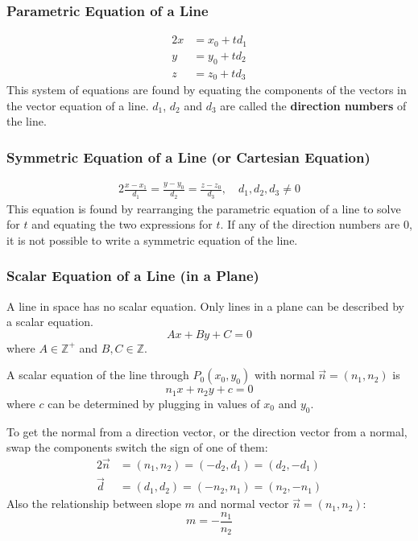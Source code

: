 \documentclass{report}
\newcommand\Z{\mathbb{Z}}
\theoremstyle{definition}
\numberwithin{equation}{section}
\begin{document}
\subsubsection{Parametric Equation of a Line}
\begin{alignat}{2}{}
	x &= x_0 + td_1 \\
	y &= y_0 + td_2 \\
	z &= z_0 + td_3
\end{alignat}
This system of equations are found by equating the components of the vectors in the vector equation of a line. $d_1$, $d_2$ and $d_3$ are called the \textbf{direction numbers} of the line.

\subsubsection{Symmetric Equation of a Line (or Cartesian Equation)}
\begin{alignat}{2}{}
	\frac{x-x_1}{d_1} = \frac{y-y_0}{d_2} = \frac{z-z_0}{d_3}, \quad d_1,d_2,d_3 \ne 0
\end{alignat}
This equation is found by rearranging the parametric equation of a line to solve for $t$ and equating the two expressions for $t$. If any of the direction numbers are $0$, it is not possible to write a symmetric equation of the line.

\subsubsection{Scalar Equation of a Line (in a Plane)}
A line in space has no scalar equation. Only lines in a plane can be described by a scalar equation.
\begin{equation}
	Ax+By+C = 0
\end{equation}
where $A \in \Z^+$ and $B,C \in \Z$.

\bigskip
\noindent
A scalar equation of the line through $P_0(x_0,y_0)$ with normal $\vec n = (n_1,n_2)$ is
\begin{equation}
	n_1x + n_2y + c = 0
\end{equation}
where $c$ can be determined by plugging in values of $x_0$ and $y_0$.

\bigskip \noindent
To get the normal from a direction vector, or the direction vector from a normal, swap the components switch the sign of one of them:
\begin{alignat*}{2}
	\vec n &= (n_1,n_2) = (-d_2, d_1) = (d_2, -d_1) \\
	\vec d &= (d_1,d_2) = (-n_2, n_1) = (n_2, -n_1)
\end{alignat*}
Also the relationship between slope $m$ and normal vector $\vec n = (n_1,n_2)$:
\begin{equation*}
	m = - \frac{n_1}{n_2}
\end{equation*}
\end{document}
